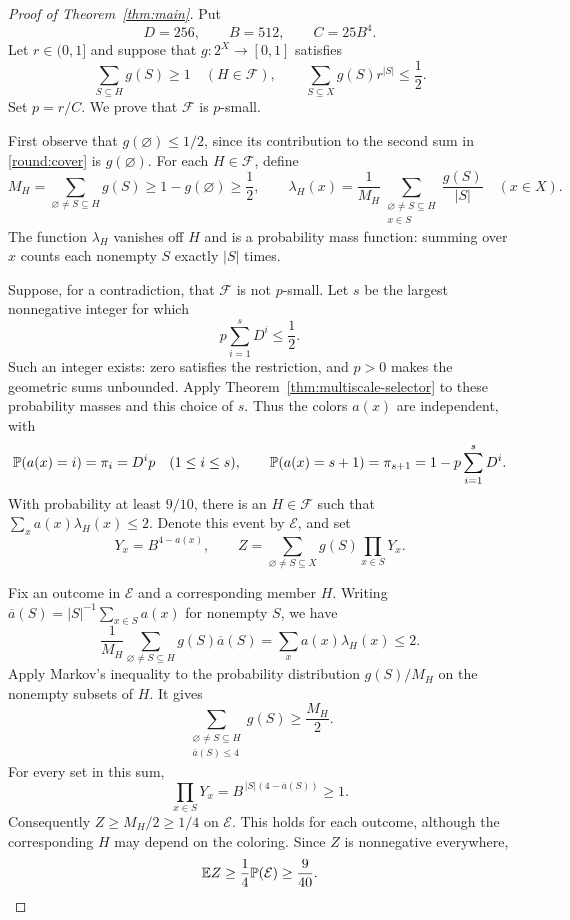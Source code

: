 \begin{proof}[Proof of Theorem~\ref{thm:main}]
Put
\[
 D=256,\qquad B=512,\qquad C=25B^4.
\]
Let $r\in(0,1]$ and suppose that $g:2^X\to[0,1]$ satisfies
\begin{equation}\label{round:cover}
 \sum_{S\subseteq H}g(S)\ge1\quad(H\in\mathcal F),
 \qquad
 \sum_{S\subseteq X}g(S)r^{|S|}\le\frac12.
\end{equation}
Set $p=r/C$. We prove that $\mathcal F$ is $p$-small.

First observe that $g(\varnothing)\le1/2$, since its contribution to the
second sum in \eqref{round:cover} is $g(\varnothing)$. For each
$H\in\mathcal F$, define
\begin{equation}\label{round:mass}
 M_H=\sum_{\varnothing\ne S\subseteq H}g(S)
 \ge1-g(\varnothing)\ge\frac12,
 \qquad
 \lambda_H(x)=\frac1{M_H}
 \sum_{\substack{\varnothing\ne S\subseteq H\\x\in S}}
 \frac{g(S)}{|S|}\quad(x\in X).
\end{equation}
The function $\lambda_H$ vanishes off $H$ and is a probability mass
function: summing over $x$ counts each nonempty $S$ exactly $|S|$ times.

Suppose, for a contradiction, that $\mathcal F$ is not $p$-small.
Let $s$ be the largest nonnegative integer for which
\begin{equation}\label{round:scale}
 p\sum_{i=1}^sD^i\le\frac12.
\end{equation}
Such an integer exists: zero satisfies the restriction, and $p>0$ makes
the geometric sums unbounded. Apply
Theorem~\ref{thm:multiscale-selector} to these probability masses and this
choice of $s$. Thus the colors $a(x)$ are independent, with
\[
 \P(a(x)=i)=\pi_i=D^ip\quad(1\le i\le s),
 \qquad
 \P(a(x)=s+1)=\pi_{s+1}=1-p\sum_{i=1}^sD^i.
\]
With probability at least $9/10$, there is an $H\in\mathcal F$ such that
$\sum_x a(x)\lambda_H(x)\le2$. Denote this event by $\mathcal E$, and set
\begin{equation}\label{round:variables}
 Y_x=B^{4-a(x)},\qquad
 Z=\sum_{\varnothing\ne S\subseteq X}g(S)\prod_{x\in S}Y_x.
\end{equation}

Fix an outcome in $\mathcal E$ and a corresponding member $H$. Writing
$\overline a(S)=|S|^{-1}\sum_{x\in S}a(x)$ for nonempty $S$, we have
\[
 \frac1{M_H}\sum_{\varnothing\ne S\subseteq H}
 g(S)\overline a(S)
 =\sum_x a(x)\lambda_H(x)\le2.
\]
Apply Markov's inequality to the probability distribution
$g(S)/M_H$ on the nonempty subsets of $H$. It gives
\[
 \sum_{\substack{\varnothing\ne S\subseteq H\\
                  \overline a(S)\le4}}g(S)\ge\frac{M_H}{2}.
\]
For every set in this sum,
\[
 \prod_{x\in S}Y_x
 =B^{\,|S|(4-\overline a(S))}\ge1.
\]
Consequently $Z\ge M_H/2\ge1/4$ on $\mathcal E$. This holds for each
outcome, although the corresponding $H$ may depend on the coloring.
Since $Z$ is nonnegative everywhere,
\begin{equation}\label{round:lower}
 \E Z\ge\frac14\P(\mathcal E)\ge\frac9{40}.
\end{equation}


\end{proof}
